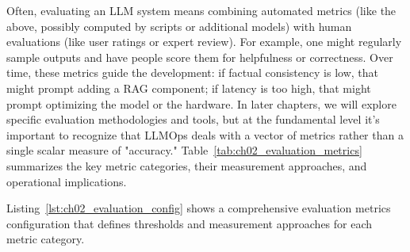 Often, evaluating an LLM system means combining automated metrics (like the above, possibly computed by scripts or additional models) with human evaluations (like user ratings or expert review). For example, one might regularly sample outputs and have people score them for helpfulness or correctness. Over time, these metrics guide the development: if factual consistency is low, that might prompt adding a RAG component; if latency is too high, that might prompt optimizing the model or the hardware. In later chapters, we will explore specific evaluation methodologies and tools, but at the fundamental level it's important to recognize that LLMOps deals with a vector of metrics rather than a single scalar measure of "accuracy." Table~\ref{tab:ch02_evaluation_metrics} summarizes the key metric categories, their measurement approaches, and operational implications.

Listing~\ref{lst:ch02_evaluation_config} shows a comprehensive evaluation metrics configuration that defines thresholds and measurement approaches for each metric category.

